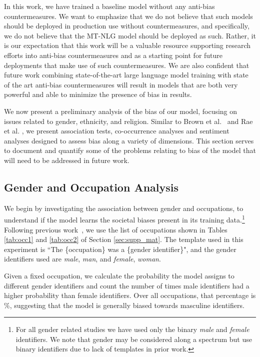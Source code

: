 \documentclass[11pt]{article}
\begin{document}
In this work, we have trained a baseline model without any anti-bias countermeasures.
We want to emphasize that we do not believe that such models should be deployed in production use without countermeasures, and specifically, we do not believe that the MT-NLG model should be deployed as such. 
Rather, it is our expectation that this work will be a valuable resource supporting research efforts into anti-bias countermeasures and as a starting point for future deployments that make use of such countermeasures. We are also confident that future work combining state-of-the-art large language model training with state of the art anti-bias countermeasures will result in models that are both very powerful and able to minimize the presence of bias in results. 

We now present a preliminary analysis of the bias of our model, focusing on issues related to gender, ethnicity, and religion. 
Similar to Brown et al.\ \cite{brown2020language} and Rae et al. \cite{Rae2021Gopher}, we present association tests, co-occurrence analyses and sentiment analyses designed to assess bias along a variety of dimensions. 
This section serves to document and quantify some of the problems relating to bias of the model that will need to be addressed in future work. 







\subsection{Gender and Occupation Analysis}


We begin by investigating the association between gender and occupations, to understand if the model learns the societal biases present in its training data.\footnote{For all gender related studies we have used only the binary \textit{male} and \textit{female} identifiers. We note that gender may be considered along a spectrum \cite{eckert_mcconnell-ginet_2003} but use binary identifiers due to lack of templates in prior work.} 
Following previous work~\cite{Bolukbasi2016ManIT,manzini2019black}, we use the list of  occupations shown in Tables \ref{tab:occ1} and \ref{tab:occ2} of Section \ref{sec:supp_mat}.
The template used in this experiment is ``The \{occupation\} was a \{gender identifier\}", and the gender identifiers used are \textit{male}, \textit{man}, and \textit{female}, \textit{woman}.

Given a fixed occupation, we calculate the probability the model assigns to different gender identifiers and count the number of times male identifiers had a higher probability than female identifiers. 
Over all  occupations, that percentage is \%, suggesting that the model is generally biased towards masculine identifiers.
\end{document}
